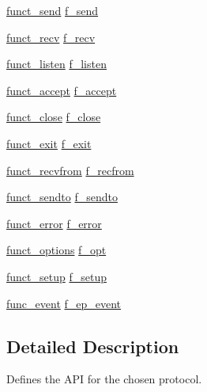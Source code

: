\begin{DoxyCompactItemize}
\hyperlink{tb__protocol_8h_a473a931a3082ddc4d122f9f4a8fd1437}{funct\-\_\-send} \hyperlink{structtb__protocol__t_a2709f2be8c51a5bc588388daf247fd42}{f\-\_\-send}
\item 
\hyperlink{tb__protocol_8h_a167282378503a61350e0d2fb4e317bb0}{funct\-\_\-recv} \hyperlink{structtb__protocol__t_aa1dc450b562c5216a20f25b4701ecb0f}{f\-\_\-recv}
\item 
\hyperlink{tb__protocol_8h_aafdc81e719bafbf5836af0764e063c6e}{funct\-\_\-listen} \hyperlink{structtb__protocol__t_a981417cf0cb6a8b6559288520f60c5a1}{f\-\_\-listen}
\item 
\hyperlink{tb__protocol_8h_a35f8591b684f7643ff28a012c71b98fa}{funct\-\_\-accept} \hyperlink{structtb__protocol__t_a2fc85e4eab79ec0b85f8b1b599919b63}{f\-\_\-accept}
\item 
\hyperlink{tb__protocol_8h_a08f2cf29907c58b40e7d04078252af61}{funct\-\_\-close} \hyperlink{structtb__protocol__t_afba2de073f269f760d4bb0197f201883}{f\-\_\-close}
\item 
\hyperlink{tb__protocol_8h_ac8027011503a44781c2e957843accec6}{funct\-\_\-exit} \hyperlink{structtb__protocol__t_ac430cf8f7a44acfe53a981335b9436a9}{f\-\_\-exit}
\item 
\hyperlink{tb__protocol_8h_a87e94687c2c2703bd383b95da63fadfb}{funct\-\_\-recvfrom} \hyperlink{structtb__protocol__t_a01abb6c514ece717e5dd4ee4c9069fb6}{f\-\_\-recfrom}
\item 
\hyperlink{tb__protocol_8h_ae60ccd51019fbfaaa90a036fc14349a7}{funct\-\_\-sendto} \hyperlink{structtb__protocol__t_a40bf261179f3043c4c05d5c030b3f463}{f\-\_\-sendto}
\item 
\hyperlink{tb__protocol_8h_a1375c398cc002ef578b1ccef351761ef}{funct\-\_\-error} \hyperlink{structtb__protocol__t_a5b3fef362953f92e9a750e44cf292b30}{f\-\_\-error}
\item 
\hyperlink{tb__protocol_8h_a329bd89568b70a3a25d5e809f31ebac7}{funct\-\_\-options} \hyperlink{structtb__protocol__t_abf29463c11fbb3ef0acccb80ca7c2c48}{f\-\_\-opt}
\item 
\hyperlink{tb__protocol_8h_a374dd8150f3cc4a07fe29de3ec5e886a}{funct\-\_\-setup} \hyperlink{structtb__protocol__t_ac590c819e0666511355921e638bca992}{f\-\_\-setup}
\item 
\hyperlink{tb__epoll_8h_ab908abbc4a276702f09c05bdf565bd64}{func\-\_\-event} \hyperlink{structtb__protocol__t_a8e1a53ac67fc143d7e7fa50e20ea641f}{f\-\_\-ep\-\_\-event}
\end{DoxyCompactItemize}


\subsection{Detailed Description}
Defines the A\-P\-I for the chosen protocol. 

